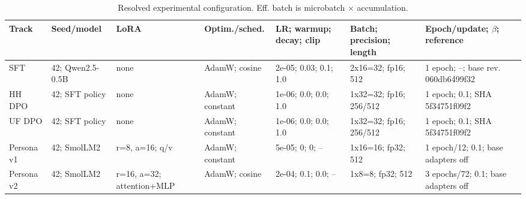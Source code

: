\begin{table}[t]\centering\scriptsize\caption{Resolved experimental configuration. Eff. batch is microbatch $\times$ accumulation.}
\setlength{\tabcolsep}{2pt}\begin{tabularx}{\textwidth}{lXXXXXX}\toprule Track & Seed/model & LoRA & Optim./sched. & LR; warmup; decay; clip & Batch; precision; length & Epoch/update; $\beta$; reference\\\midrule
SFT & 42; Qwen2.5-0.5B & none & AdamW; cosine & 2e-05; 0.03; 0.1; 1.0 & 2x16=32; fp16; 512 & 1 epoch; --; base rev. 060db6499f32\\
HH DPO & 42; SFT policy & none & AdamW; constant & 1e-06; 0.0; 0.0; 1.0 & 1x32=32; fp16; 256/512 & 1 epoch; 0.1; SHA 5f34751f09f2\\
UF DPO & 42; SFT policy & none & AdamW; constant & 1e-06; 0.0; 0.0; 1.0 & 1x32=32; fp16; 256/512 & 1 epoch; 0.1; SHA 5f34751f09f2\\
Persona v1 & 42; SmolLM2 & r=8, a=16; q/v & AdamW; constant & 5e-05; 0; 0; -- & 1x16=16; fp32; 512 & 1 epoch/12; 0.1; base adapters off\\
Persona v2 & 42; SmolLM2 & r=16, a=32; attention+MLP & AdamW; cosine & 2e-04; 0.1; 0.0; -- & 1x8=8; fp32; 512 & 3 epochs/72; 0.1; base adapters off\\
\bottomrule\end{tabularx}\end{table}
